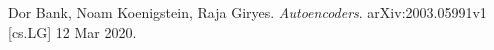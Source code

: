 \begin{thebibliography}{9}
Dor Bank, Noam Koenigstein, Raja Giryes. 
\textit{Autoencoders}. 
arXiv:2003.05991v1 [cs.LG] 12 Mar 2020.

\end{thebibliography}